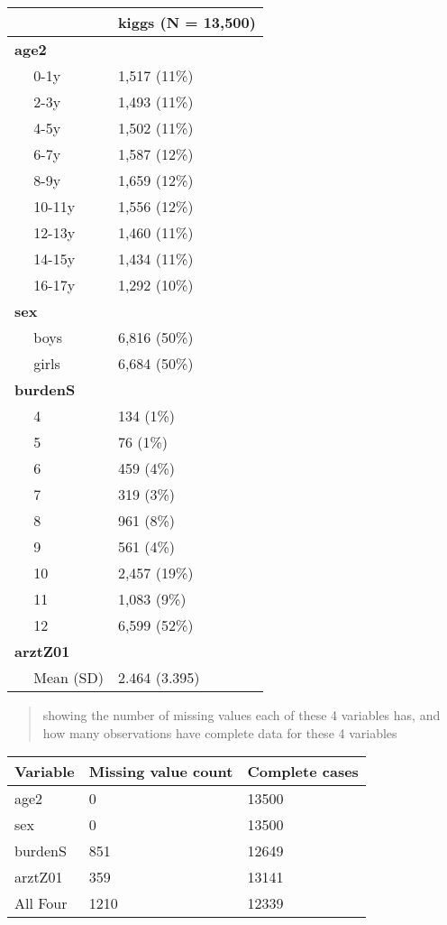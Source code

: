 \documentclass[
]{article}
\begin{document}
\begin{longtable}[]{@{}ll@{}}
\toprule()
& kiggs (N = 13,500) \\
\midrule()
\endhead
\textbf{age2} & ~~ \\
~~ 0-1y & 1,517 (11\%) \\
~~ 2-3y & 1,493 (11\%) \\
~~ 4-5y & 1,502 (11\%) \\
~~ 6-7y & 1,587 (12\%) \\
~~ 8-9y & 1,659 (12\%) \\
~~ 10-11y & 1,556 (12\%) \\
~~ 12-13y & 1,460 (11\%) \\
~~ 14-15y & 1,434 (11\%) \\
~~ 16-17y & 1,292 (10\%) \\
\textbf{sex} & ~~ \\
~~ boys & 6,816 (50\%) \\
~~ girls & 6,684 (50\%) \\
\textbf{burdenS} & ~~ \\
~~ 4 & 134 (1\%) \\
~~ 5 & 76 (1\%) \\
~~ 6 & 459 (4\%) \\
~~ 7 & 319 (3\%) \\
~~ 8 & 961 (8\%) \\
~~ 9 & 561 (4\%) \\
~~ 10 & 2,457 (19\%) \\
~~ 11 & 1,083 (9\%) \\
~~ 12 & 6,599 (52\%) \\
\textbf{arztZ01} & ~~ \\
~~ Mean (SD) & 2.464 (3.395) \\
\bottomrule()
\end{longtable}

\begin{quote}
showing the number of missing values each of these 4 variables has, and
how many observations have complete data for these 4 variables
\end{quote}

\begin{longtable}[]{@{}lll@{}}
\toprule()
Variable & Missing value count & Complete cases \\
\midrule()
\endhead
age2 & 0 & 13500 \\
sex & 0 & 13500 \\
burdenS & 851 & 12649 \\
arztZ01 & 359 & 13141 \\
All Four & 1210 & 12339 \\
\bottomrule()
\end{longtable}
\end{document}
